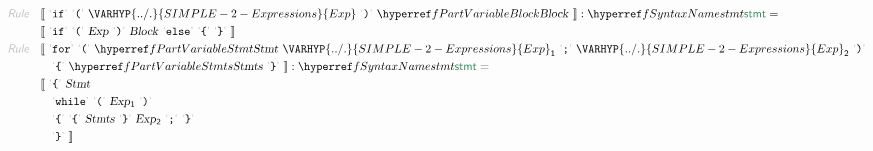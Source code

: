 \begin{align*}
  \KEY{Rule} \quad
    & \LEFTPHRASE \
        \LEX{if} \ \LEX{{(}} \ \VARHYP{../.}{SIMPLE-2-Expressions}{Exp} \ \LEX{{)}} \ \VARREF{Block} \
      \RIGHTPHRASE : \SYNREF{stmt} = \\&
      \LEFTPHRASE \
        \LEX{if} \ \LEX{{(}} \ \VAR{Exp} \ \LEX{{)}} \ \VAR{Block} \ \LEX{else} \ \LEX{{\LEFTBRACE}} \ \LEX{{\RIGHTBRACE}} \
      \RIGHTPHRASE
\\
  \KEY{Rule} \quad
    & \LEFTPHRASE \
        \LEX{for} \ \LEX{{(}} \ \VARREF{Stmt} \ \VARHYP{../.}{SIMPLE-2-Expressions}{Exp}\SUB{1} \ \LEX{{;}} \ \VARHYP{../.}{SIMPLE-2-Expressions}{Exp}\SUB{2} \ \LEX{{)}} \\&\quad
        \LEX{{\LEFTBRACE}} \ \VARREF{Stmts} \ \LEX{{\RIGHTBRACE}} \
      \RIGHTPHRASE : \SYNREF{stmt} = \\&
      \LEFTPHRASE \
        \LEX{{\LEFTBRACE}} \ \VAR{Stmt} \\&\quad
        \LEX{while} \ \LEX{{(}} \ \VAR{Exp}\SUB{1} \ \LEX{{)}} \\&\quad
        \LEX{{\LEFTBRACE}} \ \LEX{{\LEFTBRACE}} \ \VAR{Stmts} \ \LEX{{\RIGHTBRACE}} \ \VAR{Exp}\SUB{2} \ \LEX{{;}} \ \LEX{{\RIGHTBRACE}} \\&\quad
        \LEX{{\RIGHTBRACE}} \
      \RIGHTPHRASE
\end{align*}
